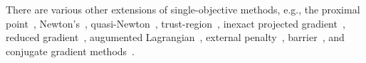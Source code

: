 \documentclass[../../main]{subfiles}
\begin{document}
There are various other extensions of single-objective methods, e.g., the proximal point~\cite{Bonnel2005}, Newton's~\cite{Fliege2009,Goncalves2021,Wang2019}, quasi-Newton~\cite{Qu2011,Povalej2014,Morovati2018}, trust-region~\cite{Qu2013,Carrizo2016}, inexact projected gradient~\cite{Fukuda2013}, reduced gradient~\cite{Maghri2018,ElMoudden2018}, augumented Lagrangian~\cite{Cocchi2020}, external penalty~\cite{White1984,Fukuda2016}, barrier~\cite{Fukuda2019}, and conjugate gradient methods~\cite{LucambioPerez2018}.
\end{document}
